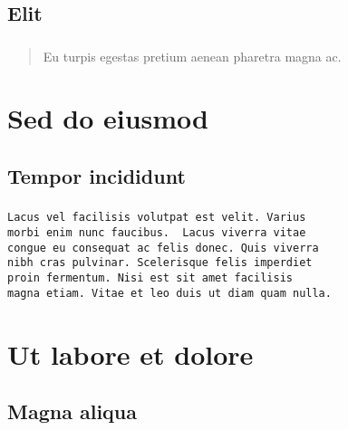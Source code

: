 \documentclass[10pt]{beamer}
\newcommand{\autotitle}{
    \frametitle{
        \secname
        \ifx \insertsubsection \empty \else { / \subsecname} \fi
    }
}
\begin{document}
\subsection{Elit}

\begin{frame}
    \autotitle
    \begin{quote}
        Eu turpis egestas pretium aenean pharetra magna ac.
    \end{quote}
\end{frame}

\section{Sed do eiusmod}
\subsection{Tempor incididunt}

\begin{frame}[fragile]
    \autotitle
    \begin{verbatim}
Lacus vel facilisis volutpat est velit. Varius
morbi enim nunc faucibus.  Lacus viverra vitae
congue eu consequat ac felis donec. Quis viverra
nibh cras pulvinar. Scelerisque felis imperdiet
proin fermentum. Nisi est sit amet facilisis
magna etiam. Vitae et leo duis ut diam quam nulla.
    \end{verbatim}
\end{frame}

\section{Ut labore et dolore}
\subsection{Magna aliqua}

\begin{frame}
\end{frame}
\end{document}
